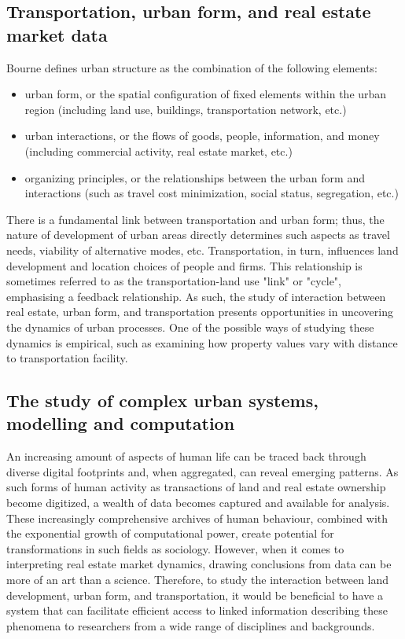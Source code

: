 \subsection{Transportation, urban form, and real estate market data} \label{subsec:transportation_urban_form_real_estate_data}

Bourne\cite{Bourne1982} defines urban structure as the combination of the following elements:
\begin{itemize}
    \item urban form, or the spatial configuration of fixed elements within the urban region (including land use, buildings, transportation network, etc.)
    \item urban interactions, or the flows of goods, people, information, and money (including commercial activity, real estate market, etc.)
    \item organizing principles, or the relationships between the urban form and interactions (such as travel cost minimization, social status, segregation, etc.)
\end{itemize}
There is a fundamental link between transportation and urban form;
thus, the nature of development of urban areas directly determines such aspects as travel needs, viability of alternative modes, etc.
Transportation, in turn, influences land development and location choices of people and firms\cite{Miller1999}.
This relationship is sometimes referred to as the transportation-land use "link" or "cycle", emphasising a feedback relationship\cite{Kelly}.
As such, the study of interaction between real estate, urban form, and transportation presents opportunities in uncovering the dynamics of urban processes.
One of the possible ways of studying these dynamics is empirical, such as examining how property values vary with distance to transportation facility\cite{Sherry1999}.

\subsection{The study of complex urban systems, modelling and computation} \label{subsec:study_of_complex_urban_systems_modelling_computation}

An increasing amount of aspects of human life can be traced back through diverse digital footprints and, when aggregated, can reveal emerging patterns.\cite{Arribas-Bel2014}
As such forms of human activity as transactions of land and real estate ownership become digitized\cite{TeranetEnterprisesInc.}, a wealth of data becomes captured and available for analysis.
These increasingly comprehensive archives of human behaviour, combined with the exponential growth of computational power, create potential for transformations in such fields as sociology\cite{Lazer2017}.
However, when it comes to interpreting real estate market dynamics, drawing conclusions from data can be more of an art than a science.\cite{Brett2009}
Therefore, to study the interaction between land development, urban form, and transportation, it would be beneficial to have a system that can facilitate efficient access to linked information describing these phenomena to researchers from a wide range of disciplines and backgrounds.

